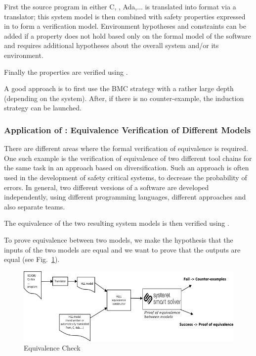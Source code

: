 First the source program in either \textsc{C}, \SCADE{}, Ada,... is translated
into \HLL{} format via a translator; this \HLL{} system model is then
combined with safety properties expressed in \HLL{} to form a verification
model. 
Environment hypotheses and constraints can be added if a property does not hold 
based  only on the formal model of the software and requires additional
hypotheses about the overall system and/or its environment.

Finally the properties are verified using \smartsolver{}.

A good approach is to first use the BMC strategy with a rather large depth
(depending on the system).
After, if there is no counter-example, the induction strategy can be launched.


\subsubsection{Application of \smartsolver{}: Equivalence Verification of Different Models}
\label{sec:equiv-verif-diff}

There are different areas where the formal verification of equivalence is
required. One such example is the verification of equivalence of two different
tool chains for the same task in an approach based on diversification. Such an
approach is often used in the development of safety critical systems, to
decrease the probability of errors. In general,  two different
versions of a software are developed independently, using different programming languages, different
approaches and also separate teams.

The equivalence of the two resulting system models is then verified using
\smartsolver{}. 

To prove equivalence between two \HLL{} models, we make the hypothesis
that the inputs of the two \HLL{} models are equal and we want to prove
that the outputs are equal (see Fig.~\ref{fig:s3-equiv-check}).


\begin{figure}[h]
  \centering
  \includegraphics[width=1\textwidth]{figures/s3equiv}
  \caption{Equivalence Check}
  \label{fig:s3-equiv-check}
\end{figure}


